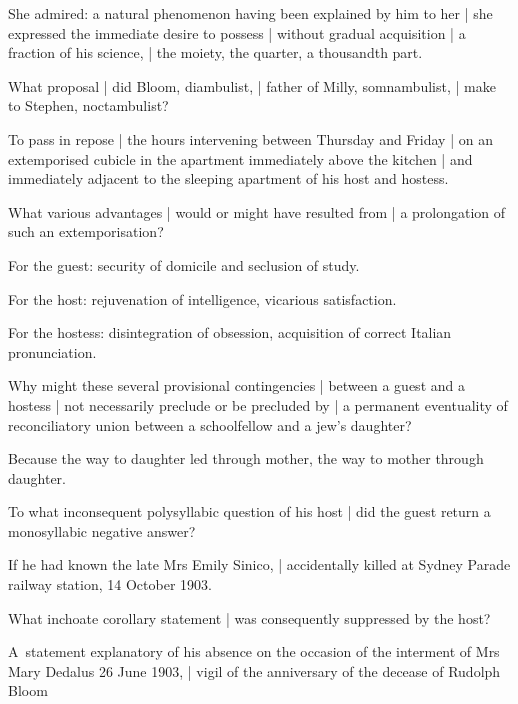 \Poetry
She admired:
a natural phenomenon having been explained by him to her |
she expressed the immediate desire to possess |
without gradual acquisition |
a fraction of his science, |
the moiety, the quarter, a thousandth part.



What proposal |
did Bloom, diambulist, |
father of Milly, somnambulist, |
make to Stephen,
noctambulist?

\Factual[~(legal)]
To pass in repose |
the hours intervening
between Thursday
and Friday
 |
on an extemporised cubicle
in the apartment immediately above the kitchen |
and immediately adjacent
to the sleeping apartment of his host and hostess.



What various advantages |
would or might have resulted from |
a prolongation of such an extemporisation?

\Stephen
For the guest:
security of domicile and seclusion of study.

\Bloom
For the host:
rejuvenation of intelligence,
vicarious satisfaction.

\Molly
For the hostess:
disintegration of obsession,
acquisition of correct Italian pronunciation.


Why might these several provisional contingencies |
between a guest and a hostess |
not necessarily preclude or be precluded by |
a permanent eventuality of reconciliatory union
between a schoolfellow and a jew's daughter?

\Religious
Because the way to daughter led through mother,
the way to mother through daughter.



To what inconsequent polysyllabic question of his host |
did the guest return a monosyllabic negative answer?

\Places
If he had known the late Mrs Emily Sinico, |
accidentally killed at Sydney Parade railway station, 14 October 1903.


What inchoate corollary statement |
was consequently suppressed by the host?

\Factual[~(legal)]
A~statement explanatory of his absence
on the occasion of the interment
of Mrs Mary Dedalus
26 June 1903, |
vigil of the anniversary of the decease of Rudolph Bloom



